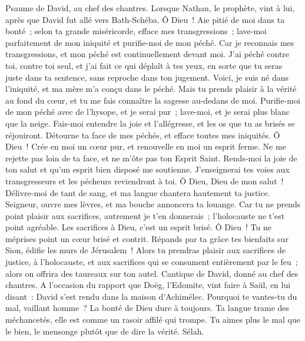 \begin{multicols}{2}
\VerseOne{}Psaume de David, au chef des chantres.
Lorsque Nathan, le prophète, vint à lui, après que David fut allé vers Bath-Schéba.
Ô Dieu~! Aie pitié de moi dans ta bonté~; selon ta grande miséricorde, efface mes transgressions~;
lave-moi parfaitement de mon iniquité et purifie-moi de mon péché.
Car je reconnais mes transgressions, et mon péché est continuellement devant moi.
J'ai péché contre toi, contre toi seul, et j'ai fait ce qui déplaît à tes yeux, en sorte que tu seras juste dans ta sentence, sans reproche dans ton jugement.
Voici, je suis né dans l'iniquité, et ma mère m'a conçu dans le péché.
Mais tu prends plaisir à la vérité au fond du cœur, et tu me fais connaître la sagesse au-dedans de moi.
Purifie-moi de mon péché avec de l'hysope, et je serai pur~; lave-moi, et je serai plus blanc que la neige.
Fais-moi entendre la joie et l'allégresse, et les os que tu as brisés se réjouiront.
Détourne ta face de mes péchés, et efface toutes mes iniquités.
Ô Dieu~! Crée en moi un cœur pur, et renouvelle en moi un esprit ferme.
Ne me rejette pas loin de ta face, et ne m'ôte pas ton Esprit Saint.
Rends-moi la joie de ton salut et qu'un esprit bien disposé me soutienne.
J'enseignerai tes voies aux transgresseurs et les pécheurs reviendront à toi.
Ô Dieu, Dieu de mon salut~! Délivre-moi de tant de sang, et ma langue chantera hautement ta justice.
Seigneur, ouvre mes lèvres, et ma bouche annoncera ta louange.
Car tu ne prends point plaisir aux sacrifices, autrement je t'en donnerais~; l'holocauste ne t'est point agréable.
Les sacrifices à Dieu, c'est un esprit brisé. Ô Dieu~! Tu ne méprises point un cœur brisé et contrit.
Répands par ta grâce tes bienfaits sur Sion, édifie les murs de Jérusalem~!
Alors tu prendras plaisir aux sacrifices de justice, à l'holocauste, et aux sacrifices qui se consument entièrement par le feu~; alors on offrira des taureaux sur ton autel.
\VerseOne{}Cantique de David, donné au chef des chantres.
A l'occasion du rapport que Doëg, l'Edomite, vint faire à Saül, en lui disant~: David s'est rendu dans la maison d'Achimélec.
Pourquoi te vantes-tu du mal, vaillant homme~? La bonté de Dieu dure à toujours.
Ta langue trame des méchancetés, elle est comme un rasoir affilé qui trompe.
Tu aimes plus le mal que le bien, le mensonge plutôt que de dire la vérité. Sélah.

\end{multicols}
